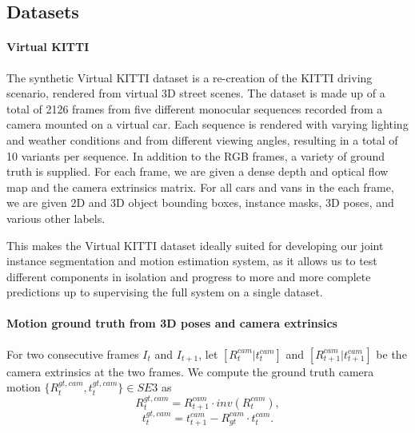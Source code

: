
\subsection{Datasets}

\paragraph{Virtual KITTI}
The synthetic Virtual KITTI dataset is a re-creation of the KITTI driving scenario,
rendered from virtual 3D street scenes.
The dataset is made up of a total of 2126 frames from five different monocular sequences recorded from a camera mounted on
a virtual car.
Each sequence is rendered with varying lighting and weather conditions and from different viewing angles, resulting
in a total of 10 variants per sequence.
In addition to the RGB frames, a variety of ground truth is supplied.
For each frame, we are given a dense depth and optical flow map and the camera extrinsics matrix.
For all cars and vans in the each frame, we are given 2D and 3D object bounding boxes, instance masks, 3D poses,
and various other labels.

This makes the Virtual KITTI dataset ideally suited for developing our joint instance segmentation
and motion estimation system, as it allows us to test different components in isolation and
progress to more and more complete predictions up to supervising the full system on a single dataset.

\paragraph{Motion ground truth from 3D poses and camera extrinsics}
For two consecutive frames $I_t$ and $I_{t+1}$, let $[R_t^{cam}|t_t^{cam}]$ and $[R_{t+1}^{cam}|t_{t+1}^{cam}]$ be
the camera extrinsics at the two frames.
We compute the ground truth camera motion $\{R_t^{gt, cam}, t_t^{gt, cam}\} \in SE3$ as
\begin{equation}
R_{t}^{gt, cam} = R_{t+1}^{cam}  \cdot inv(R_t^{cam}),
\end{equation}
\begin{equation}
t_{t}^{gt, cam} = t_{t+1}^{cam}  - R_{gt}^{cam} \cdot t_t^{cam}.
\end{equation}


